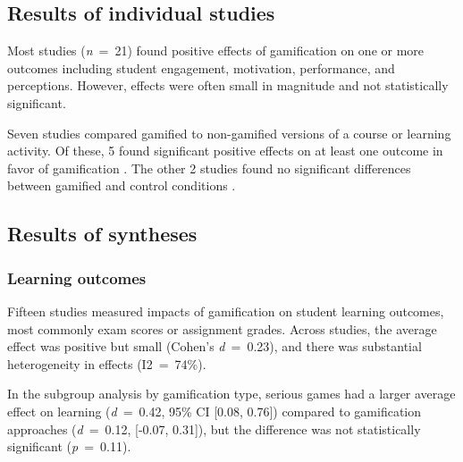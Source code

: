 \documentclass[
	hf,
	]{ceurart}
\begin{document}
		
		\subsection{Results of individual studies}
		
		Most studies (\textit{n}~=~21) found positive effects of gamification on one or more outcomes including student engagement, motivation, performance, and perceptions. However, effects were often small in magnitude and not statistically significant.
		
		Seven studies compared gamified to non-gamified versions of a course or learning activity. Of these, 5 found significant positive effects on at least one outcome in favor of gamification \cite{Mora2016, Berkling2013, Iosup2014, Hasan2018, Matsubara2017}. The other 2 studies found no significant differences between gamified and control conditions \cite{Morales-Trujillo2021, Akpolat2014149}.
		
		\subsection{Results of syntheses}
		
		\subsubsection{Learning outcomes}
		
		Fifteen studies measured impacts of gamification on student learning outcomes, most commonly exam scores or assignment grades. Across studies, the average effect was positive but small (Cohen's \textit{d}~=~0.23), and there was substantial heterogeneity in effects (I2~=~74\%). 
		
		In the subgroup analysis by gamification type, serious games had a larger average effect on learning (\textit{d}~=~0.42, 95\% CI [0.08, 0.76]) compared to gamification approaches (\textit{d}~=~0.12, [-0.07, 0.31]), but the difference was not statistically significant (\textit{p}~=~0.11).
		
		
\end{document}
